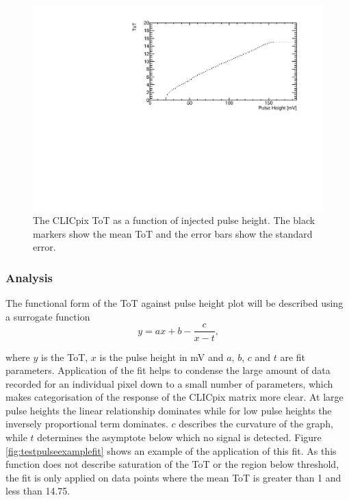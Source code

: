 \begin{figure}[h!]
\centering
\includegraphics[width=1.0\textwidth]{CLICdpVertex/Plots/TestPulseCalibration/Fits/Set9/ToT_PulseHeight_Set_9_ChipID_001ec0db94b1_Pixel_x0_y0_NoFit.pdf}
\caption[The CLICpix ToT as a function of injected pulse height.  The black markers show the mean ToT and the error bars show the standard error.]{The CLICpix ToT as a function of injected pulse height.  The black markers show the mean ToT and the error bars show the standard error.}
\label{fig:testpulseexamplenofit}
\end{figure}


\subsubsection{Analysis}
The functional form of the ToT against pulse height plot will be described using a surrogate function \cite{AlipourTehrani:2054922}
\begin{equation}
y  = ax + b  - \frac{c}{x-t} \text{,}
\end{equation}

\noindent where $y$ is the ToT, $x$ is the pulse height in mV and $a$, $b$, $c$ and $t$ are fit parameters.  Application of the fit helps to condense the large amount of data recorded for an individual pixel down to a small number of parameters, which makes categorisation of the response of the CLICpix matrix more clear.  At large pulse heights the linear relationship dominates while for low pulse heights the inversely proportional term dominates.  $c$ describes the curvature of the graph, while $t$ determines the asymptote below which no signal is detected.  Figure \ref{fig:testpulseexamplefit} shows an example of the application of this fit.  As this function does not describe saturation of the ToT or the region below threshold, the fit is only applied on data points where the mean ToT is greater than 1 and less than 14.75.  

